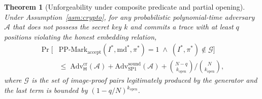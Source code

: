 \documentclass{article}
\theoremstyle{plain}
\newtheorem{theorem}{Theorem}[section]
\theoremstyle{definition}
\theoremstyle{remark}
\begin{document}
\begin{theorem}[Unforgeability under composite predicate and partial opening]\label{thm:unforgeability}
Under Assumption~\ref{asm:crypto}, for any probabilistic polynomial-time adversary $\mathcal{A}$ that does not possess the secret key $k$ and commits a trace with at least $q$ positions violating the honest embedding relation,
\begin{align*}
\Pr[&\mathrm{PP\text{-}Mark}_{\mathrm{accept}}(I^*, \mathrm{md}^*, \pi^*) = 1 \;\wedge\; (I^*, \pi^*) \notin \mathcal{G}] \\
&\leq \; \mathrm{Adv}^{\mathrm{cr}}_{\mathsf{H}}(\mathcal{A}) + \mathrm{Adv}^{\mathrm{sound}}_{\mathrm{SP1}}(\mathcal{A}) + \binom{N-q}{k_{\mathrm{open}}} \big/ \binom{N}{k_{\mathrm{open}}},
\end{align*}
where $\mathcal{G}$ is the set of image-proof pairs legitimately produced by the generator and the last term is bounded by $(1 - q/N)^{k_{\mathrm{open}}}$.
\end{theorem}
\end{document}
